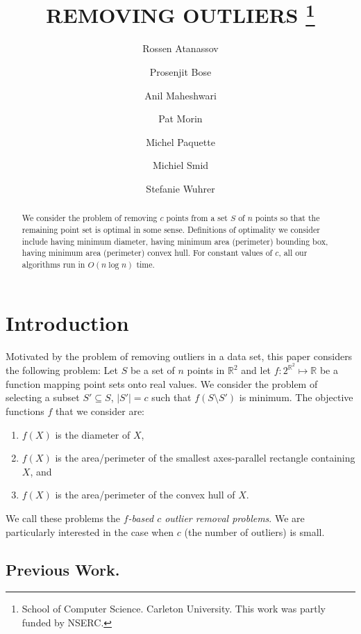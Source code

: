 \documentclass[lotsofwhite]{patmorin}
\title{
\MakeUppercase{Removing Outliers}%
\thanks{School of Computer Science. Carleton University. This work was partly funded by NSERC.}}
\author{Rossen Atanassov \and
	Prosenjit Bose \and
	Anil Maheshwari \and
	Pat Morin \and
	Michel Paquette \and
	Michiel Smid \and
	Stefanie Wuhrer
}
\date{}
\begin{document}
\maketitle

\begin{abstract}
We consider the problem of removing $c$ points from a set $S$ of $n$
points so that the remaining point set is optimal in some sense.
Definitions of optimality we consider include having minimum diameter,
having minimum area (perimeter) bounding box, having minimum area
(perimeter) convex hull.  For constant values of $c$, all our
algorithms run in $O(n\log n)$ time.
\end{abstract}

\section{Introduction}

Motivated by the problem of removing outliers in a data set, this
paper considers the following problem: Let $S$ be a set of $n$ points
in $\mathbb{R}^2$ and let $f:2^{\mathbb{R}^2}\mapsto \mathbb{R}$ be a
function mapping point sets onto real values.  We consider the problem
of selecting a subset $S'\subseteq S$, $|S'|=c$ such that
$f(S\setminus S')$ is minimum.  The objective functions $f$ that we
consider are:
\begin{enumerate}
\item $f(X)$ is the diameter of $X$,
\item $f(X)$ is the area/perimeter of the smallest axes-parallel
rectangle containing $X$, and
\item $f(X)$ is the area/perimeter of the convex hull of $X$.
\end{enumerate}  

We call these problems the \emph{$f$-based $c$ outlier removal problems}.
We are particularly interested in the case when $c$ (the number of
outliers) is small.

\subsection{Previous Work.} 
\end{document}
